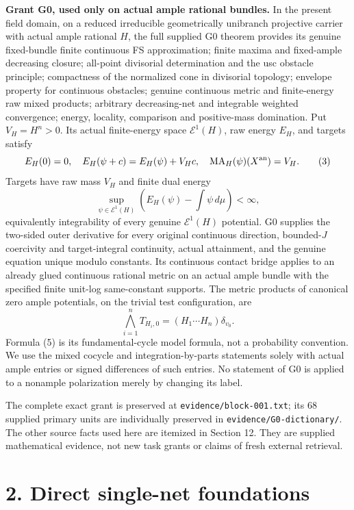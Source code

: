 \documentclass[
  10pt,
]{article}
\begin{document}
\textbf{Grant G0, used only on actual ample rational bundles.} In the
present field domain, on a reduced irreducible geometrically unibranch
projective carrier with actual ample rational \(H\), the full supplied
G0 theorem provides its genuine fixed-bundle finite continuous FS
approximation; finite maxima and fixed-ample decreasing closure;
all-point divisorial determination and the usc obstacle principle;
compactness of the normalized cone in divisorial topology; envelope
property for continuous obstacles; genuine continuous metric and
finite-energy raw mixed products; arbitrary decreasing-net and
integrable weighted convergence; energy, locality, comparison and
positive-mass domination. Put \(V_H=H^n>0\). Its actual finite-energy
space \(\mathcal E^1(H)\), raw energy \(E_H\), and targets satisfy
\[ E_H(0)=0,\quad E_H(\psi+c)=E_H(\psi)+V_Hc,
\quad \operatorname{MA}_H(\psi)(X^{\rm an})=V_H.\tag{3}\] Targets have
raw mass \(V_H\) and finite dual energy
\[\sup_{\psi\in\mathcal E^1(H)}\left(E_H(\psi)-\int\psi\,d\mu\right)<\infty,\tag{4}\]
equivalently integrability of every genuine \(\mathcal E^1(H)\)
potential. G0 supplies the two-sided outer derivative for every original
continuous direction, bounded-\(J\) coercivity and target-integral
continuity, actual attainment, and the genuine equation unique modulo
constants. Its continuous contact bridge applies to an already glued
continuous rational metric on an actual ample bundle with the specified
finite unit-log same-constant supports. The metric products of canonical
zero ample potentials, on the trivial test configuration, are
\[\bigwedge_{i=1}^n T_{H_i,0}=(H_1\cdots H_n)\delta_{v_0}.\tag{5}\]
Formula (5) is its fundamental-cycle model formula, not a probability
convention. We use the mixed cocycle and integration-by-parts statements
solely with actual ample entries or signed differences of such entries.
No statement of G0 is applied to a nonample polarization merely by
changing its label.

The complete exact grant is preserved at
\texttt{evidence/block-001.txt}; its 68 supplied primary units are
individually preserved in \texttt{evidence/G0-dictionary/}. The other
source facts used here are itemized in Section 12. They are supplied
mathematical evidence, not new task grants or claims of fresh external
retrieval.

\section{2. Direct single-net
foundations}\label{direct-single-net-foundations}
\end{document}
